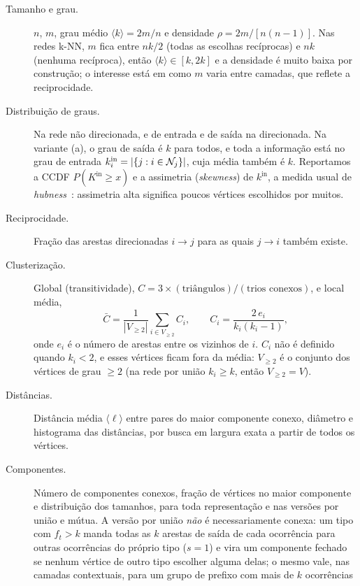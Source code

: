 \begin{description}
    \item[Tamanho e grau.] $n$, $m$, grau médio $\langle k\rangle=2m/n$ e densidade
    $\rho=2m/[n(n-1)]$. Nas redes k-NN, $m$ fica entre $nk/2$ (todas as escolhas recíprocas) e
    $nk$ (nenhuma recíproca), então $\langle k\rangle\in[k,2k]$ e a densidade é muito baixa
    por construção; o interesse está em como $m$ varia entre camadas, que reflete a
    reciprocidade.
    \item[Distribuição de graus.] Na rede não direcionada, e de entrada e de saída na
    direcionada. Na variante (a), o grau de saída é $k$ para todos, e toda a informação está no
    grau de entrada $k^{\mathrm{in}}_i=|\{j: i\in\mathcal{N}_j\}|$, cuja média também é $k$. Reportamos a
    CCDF $P(K^{\mathrm{in}}\ge x)$ e a assimetria (\emph{skewness}) de $k^{\mathrm{in}}$, a medida
    usual de \emph{hubness}~\cite{radovanovic2010}: assimetria alta significa poucos vértices
    escolhidos por muitos.
    \item[Reciprocidade.] Fração das arestas direcionadas $i\to j$ para as quais $j\to i$
    também existe.
    \item[Clusterização.] Global (transitividade),
    $C=3\times(\text{triângulos})/(\text{trios conexos})$, e local média,
    \begin{equation}
        \bar C=\frac{1}{|V_{\ge2}|}\sum_{i\in V_{\ge2}} C_i,\qquad C_i=\frac{2\,e_i}{k_i(k_i-1)},
    \end{equation}
    onde $e_i$ é o número de arestas entre os vizinhos de $i$. $C_i$ não é definido quando
    $k_i<2$, e esses vértices ficam fora da média: $V_{\ge2}$ é o conjunto dos vértices de
    grau $\ge 2$ (na rede por união $k_i\ge k$, então $V_{\ge2}=V$).
    \item[Distâncias.] Distância média $\langle\ell\rangle$ entre pares do maior componente
    conexo, diâmetro e histograma das distâncias, por busca em largura exata a partir de todos
    os vértices.
    \item[Componentes.] Número de componentes conexos, fração de vértices no maior componente
    e distribuição dos tamanhos, para toda representação e nas versões por união e mútua. A
    versão por união \emph{não} é necessariamente conexa: um tipo com $f_t>k$ manda todas as
    $k$ arestas de saída de cada ocorrência para outras ocorrências do próprio tipo ($s=1$) e
    vira um componente fechado se nenhum vértice de outro tipo escolher alguma delas; o mesmo
    vale, nas camadas contextuais, para um grupo de prefixo com mais de $k$ ocorrências

\end{description}
